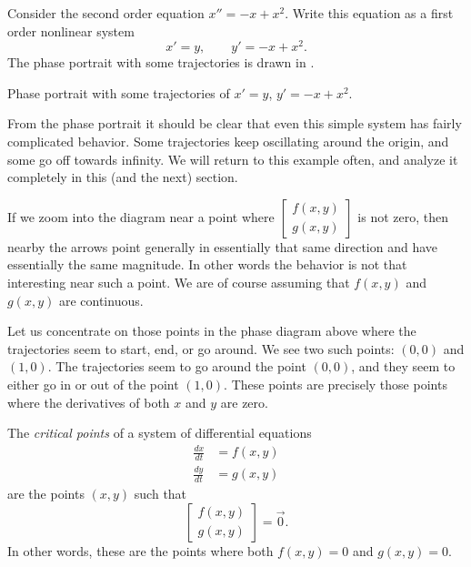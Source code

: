 \documentclass{ximera}
\begin{document}
\begin{example} \label{example:nlin-1b-example}
    Consider the second order equation $x''=-x+x^2$. Write this equation as a first order nonlinear system
    \begin{equation*}
        x' = y , \qquad y' = -x+x^2 .
    \end{equation*}
    The phase portrait with some trajectories is drawn in .
    \begin{myfig}
        \capstart
        \caption{Phase portrait with some trajectories of $x' = y$, $y' = -x+x^2$. \label{fig:nlin-1b}}
    \end{myfig}
    
    From the phase portrait it should be clear that even this simple system has fairly complicated behavior.  Some trajectories keep oscillating around the origin, and some go off towards infinity.  We will return to this example often, and analyze it completely in this (and the next) section.
\end{example}

If we zoom into the diagram near a point where 
$\left[ \begin{smallmatrix} f(x,y) \\ g(x,y) \end{smallmatrix} \right]$ 
is not zero, then nearby the arrows point generally in essentially that same direction and have essentially the same magnitude. In other words the behavior is not that interesting near such a point. We are of course assuming that $f(x,y)$ and $g(x,y)$ are continuous.

Let us concentrate on those points in the phase diagram above where the trajectories seem to start, end, or go around.  We see two such points: $(0,0)$ and $(1,0)$.  The trajectories seem to go around the point $(0,0)$, and they seem to either go in or out of the point $(1,0)$.
%
These points are precisely those points where the derivatives of both $x$ and $y$ are zero.  

\begin{definition} 
    The \emph{critical points} of a system of differential equations
    \begin{equation*}
        \begin{split}
            \frac{dx}{dt} &= f(x,y) \\
            \frac{dy}{dt} &= g(x,y)
        \end{split}
    \end{equation*}
    are the points $(x,y)$ such that
    \begin{equation*} 
        \begin{bmatrix} 
            f(x,y) \\ 
            g(x,y) 
        \end{bmatrix} = \vec{0} .
    \end{equation*}
    In other words, these are the points where both $f(x,y)=0$ and $g(x,y)=0$.
\end{definition}
\end{document}
